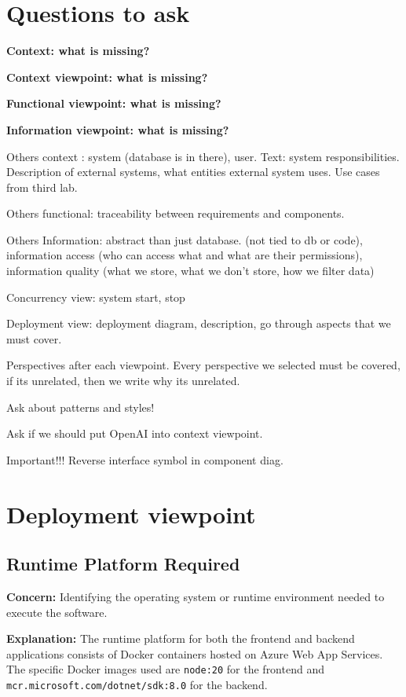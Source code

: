 \documentclass[a4paper,12pt]{article}
\begin{document}
\tableofcontents
\newpage

\section{Questions to ask}

\textbf{Context: what is missing?}

\textbf{Context viewpoint: what is missing?}

\textbf{Functional viewpoint: what is missing?}

\textbf{Information viewpoint: what is missing?}

Others context : system (database is in there), user. Text: system responsibilities. Description of external systems, what entities external system uses. Use cases from third lab.

Others functional: traceability between requirements and components.

Others Information: abstract than just database. (not tied to db or code), information access (who can access what and what are their permissions), information quality (what we store, what we don't store, how we filter data)

Concurrency view: system start, stop

Deployment view: deployment diagram, description, go through aspects that we must cover.

Perspectives after each viewpoint. Every perspective we selected must be covered, if its unrelated, then we write why its unrelated.

Ask about patterns and styles!

Ask if we should put OpenAI into context viewpoint.

Important!!! Reverse interface symbol in component diag.

\section{Deployment viewpoint}

\subsection{Runtime Platform Required}
\textbf{Concern:} Identifying the operating system or runtime environment needed to execute the software.

\textbf{Explanation:} The runtime platform for both the frontend and backend applications consists of Docker containers hosted on Azure Web App Services. The specific Docker images used are \texttt{node:20} for the frontend and \texttt{mcr.microsoft.com/dotnet/sdk:8.0} for the backend.
\end{document}
